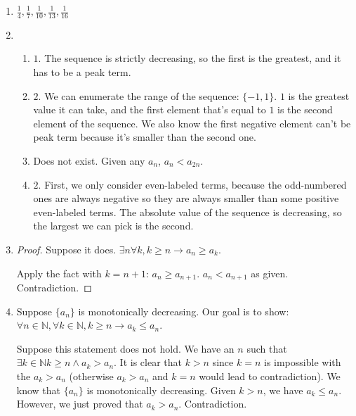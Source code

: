 \documentclass{article}
\begin{document}
\begin{enumerate}
\begin{enumerate}[label=\alph*.]
    \item true.
      \begin{proof}
        Suppose the statement is false. There exists a sequence $a_n$
        in $[0,\infty)$
        such that $\lim_{n\rightarrow \infty}a_n = c < 0$. Then for
        the positive number $-\frac{c}{2}$, there is an $N$ such that
        $n \geq N \rightarrow |a_n - c| < -\frac{c}{2}$. This
        inequality can be rewritten as $-\frac{3}{2}c < a_n <
        \frac{c}{2} < 0$, but we know $a_n \geq 0$ for all $n$. Contradiction.
      \end{proof}
    \item false.
      $\{n\}$ as a counterexample.
  \end{enumerate}
\item $\frac{1}{4},\frac{1}{7},\frac{1}{10},\frac{1}{13},\frac{1}{16}$
\item
  \begin{enumerate}[label=\alph*.]
  \item $1$. The sequence is strictly decreasing, so the first is the
    greatest, and it has to be a peak term.
  \item $2$. We can enumerate the range of the sequence:
    $\{-1,1\}$. $1$ is the greatest value it can take, and the first
    element that's equal to $1$ is the second element of the
    sequence. We also know the first negative element can't be peak
    term because it's smaller than the second one.
  \item Does not exist. Given any $a_n$, $a_n < a_{2n}$. 
  \item $2$. First, we only consider even-labeled terms, because the
    odd-numbered ones are always negative so they are always smaller
    than some positive even-labeled terms. The absolute value of the
    sequence is decreasing, so the largest we can pick is the second.
  \end{enumerate}
\item
  \begin{proof}
    Suppose it does. $\exists n \forall k, k\geq n \rightarrow a_n
    \geq a_k$.

    Apply the fact with $k=n+1$: $a_n \geq a_{n+1}$. $a_n < a_{n+1}$
    as given. Contradiction.
  \end{proof}
\item
  Suppose $\{a_n\}$ is monotonically decreasing. 
  Our goal is to show: $\forall n \in \mathbb{N}, \forall k \in \mathbb{N}, k \geq n
  \rightarrow a_k \leq a_n$.

  Suppose this statement does not hold. We have an $n$ such that
  $\exists k \in \mathbb{N} k \geq n \land a_k > a_n$. It is clear
  that $k > n$ since $k = n$ is impossible with the $a_k > a_n$
  (otherwise $a_k > a_n$ and $k = n$ would lead to contradiction). We
  know that $\{a_n\}$ is monotonically decreasing. Given $k > n$, we
  have $a_k \leq a_n$. However, we just proved that $a_k > a_n$. Contradiction.
  


\end{enumerate}
\end{document}
